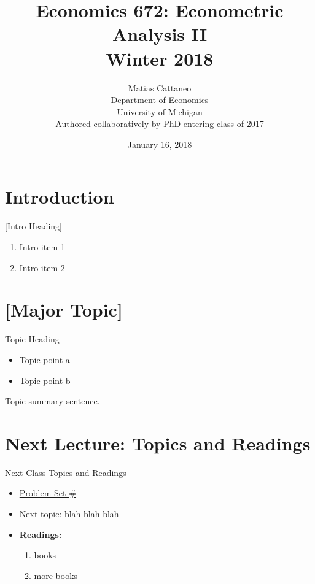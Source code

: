 \documentclass[fleqn, 10pt]{beamer}
\title[Econ-672]{Economics 672: Econometric Analysis II \\ Winter 2018}
\author[M. Cattaneo]{Matias Cattaneo \\
        Department of Economics \\
        University of Michigan \\
        Authored collaboratively by PhD entering class of 2017
        }
\date{January 16, 2018}
\begin{document}


\begin{frame}[plain]
    \titlepage
\end{frame}


\section{Introduction}

\begin{frame}{[Intro Heading]}
    \begin{enumerate}
		\item Intro item 1
		\item Intro item 2
	\end{enumerate}
\end{frame}


\section{[Major Topic]}

\begin{frame}{Topic Heading}

    \begin{itemize}
		\item Topic point a
		\item Topic point b
	\end{itemize}
	Topic summary sentence.
	
\end{frame}


\section{Next Lecture: Topics and Readings}

\begin{frame}{Next Class Topics and Readings}
	
	\begin{itemize}
		\item \underline{Problem Set \#}
		\item Next topic: blah blah blah
		\item \textbf{Readings:}
		\begin{enumerate}
			\item books
			\item more books
		\end{enumerate}
	\end{itemize}
	
\end{frame}
\end{document}
